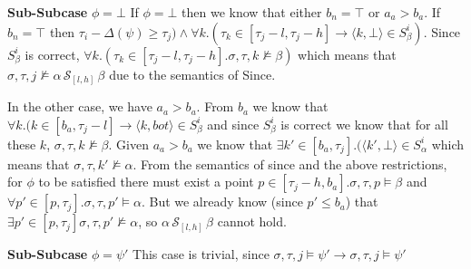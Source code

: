 \documentclass[10pt,a4paper]{article}
\newcommand{\rp}[2]{\ensuremath{\langle #1, #2 \rangle}}
\begin{document}
\hspace{2em} \textbf{Sub-Subcase} $\phi = \bot$
If $\phi = \bot$ then we know that either $b_n = \top$ or $a_a > b_a$. If $b_n = \top$ then $\tau_i-\Delta(\psi) \geq \tau_j) \wedge \forall k.(\tau_k \in [\tau_j-l,\tau_j-h] \rightarrow \rp{k}{\bot} \in S^i_\beta)$. Since $S^i_\beta$ is correct, $\forall k.(\tau_k \in [\tau_j-l,\tau_j-h]. \sigma, \tau, k \nvDash \beta)$ which means that $\sigma, \tau, j \nvDash \alpha\, \mathcal{S}_{[l,h]}\, \beta$ due to the semantics of Since.

In the other case, we have $a_a > b_a$. From $b_a$ we know that $\forall k.(k \in [b_a,\tau_j-l] \rightarrow \rp{k}{bot} \in S^i_\beta$ and since $S^i_\beta$ is correct we know that for all these $k$, $\sigma,\tau,k \nvDash \beta$. Given $a_a > b_a$ we know that $\exists k' \in [b_a,\tau_j].(\rp{k'}{\bot} \in S^i_\alpha$ which means that $\sigma, \tau, k' \nvDash \alpha$. From the semantics of since and the above restrictions, for $\phi$ to be satisfied there must exist a point $p \in [\tau_j-h,b_a]. \sigma, \tau, p \vDash \beta$ and $\forall p' \in [p, \tau_j]. \sigma, \tau, p' \vDash \alpha$. But we already know (since $p' \leq b_a$) that $\exists p' \in [p,\tau_j] \sigma, \tau, p' \nvDash \alpha$, so $\alpha\, \mathcal{S}_{[l,h]}\, \beta$ cannot hold.

\hspace{2em} \textbf{Sub-Subcase} $\phi = \psi'$
This case is trivial, since $\sigma,\tau,j\vDash \psi' \rightarrow \sigma,\tau,j\vDash \psi'$
\end{document}
